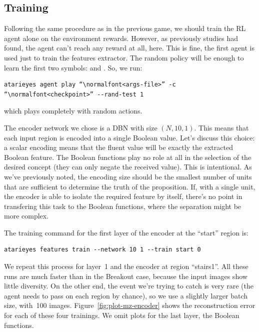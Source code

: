 \subsection{Training}

Following the same procedure as in the previous game, we should train the RL
agent alone on the environment rewards. However, as previously studies had
found, the agent can't reach any reward at all, here. This is fine, the first
agent is used just to train the features extractor. The random policy will be
enough to learn the first two symbols:  and .
So, we run:
\begin{verbatim}
atarieyes agent play “\normalfont<args-file>” -c “\normalfont<checkpoint>” --rand-test 1
\end{verbatim}
which plays completely with random actions.

The encoder network we chose is a DBN with size $(N, 10, 1)$. This means that
each input region is encoded into a single Boolean value. Let's discuss this
choice: a scalar encoding means that the fluent value will be exactly the
extracted Boolean feature. The Boolean functions play no role at all in the
selection of the desired concept (they can only negate the received value).
This is intentional. As we've previously noted, the encoding size should be
the smallest number of units that are sufficient to determine the truth of the
proposition. If, with a single unit, the encoder is able to isolate the
required feature by itself, there's no point in transfering this task to the
Boolean functions, where the separation might be more complex.

The training command for the first layer of the encoder at the ``start''
region is:
\begin{verbatim}
atarieyes features train --network 10 1 --train start 0
\end{verbatim}
We repeat this process for layer~1 and the encoder at region ``stairs1''.
All these runs are much faster than in the Breakout case, because the
input images show little diversity. On the other end, the event we're trying
to catch is very rare (the agent needs to pass on each region by chance), so
we use a slightly larger batch size, with~100 images.
Figure~\ref{fig:plot-mz-encoder} shows the reconstruction error for each of
these four trainings. We omit plots for the last layer, the Boolean functions.

